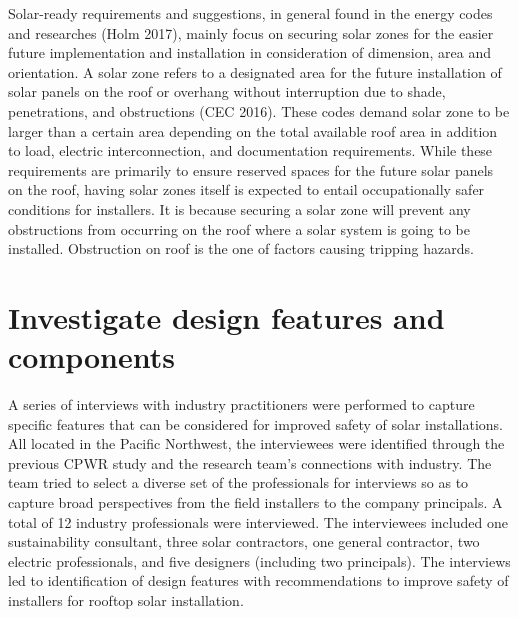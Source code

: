 \documentclass[]{article}
\begin{document}
Solar-ready requirements and suggestions, in general found in the energy
codes and researches (Holm 2017), mainly focus on securing solar zones
for the easier future implementation and installation in consideration
of dimension, area and orientation. A solar zone refers to a designated
area for the future installation of solar panels on the roof or overhang
without interruption due to shade, penetrations, and obstructions (CEC
2016). These codes demand solar zone to be larger than a certain area
depending on the total available roof area in addition to load, electric
interconnection, and documentation requirements. While these
requirements are primarily to ensure reserved spaces for the future
solar panels on the roof, having solar zones itself is expected to
entail occupationally safer conditions for installers. It is because
securing a solar zone will prevent any obstructions from occurring on
the roof where a solar system is going to be installed. Obstruction on
roof is the one of factors causing tripping hazards.

\hypertarget{investigate-design-features-and-components}{%
\section{Investigate design features and
components}\label{investigate-design-features-and-components}}

A series of interviews with industry practitioners were performed to
capture specific features that can be considered for improved safety of
solar installations. All located in the Pacific Northwest, the
interviewees were identified through the previous CPWR study and the
research team's connections with industry. The team tried to select a
diverse set of the professionals for interviews so as to capture broad
perspectives from the field installers to the company principals. A
total of 12 industry professionals were interviewed. The interviewees
included one sustainability consultant, three solar contractors, one
general contractor, two electric professionals, and five designers
(including two principals). The interviews led to identification of
design features with recommendations to improve safety of installers for
rooftop solar installation.
\end{document}
